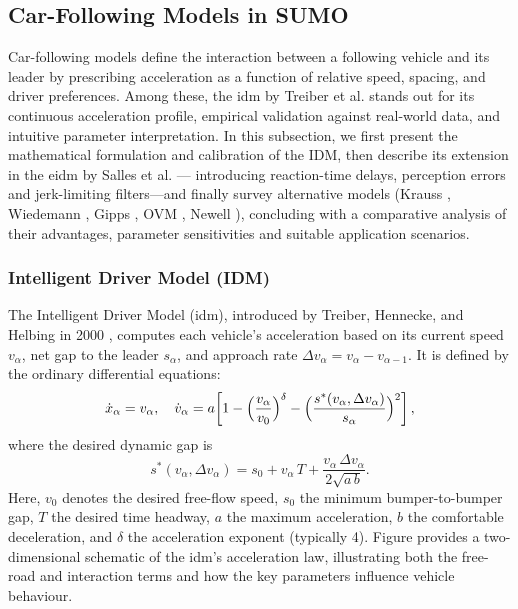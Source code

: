 
\subsection{Car-Following Models in SUMO}
\label{subsec:car_following_models}

Car-following models define the interaction between a following vehicle and its leader by prescribing acceleration as a function of relative speed, spacing, and driver preferences. Among these, the \ac{idm} by Treiber et al. \cite{Treiber_2000} stands out for its continuous acceleration profile, empirical validation against real-world data, and intuitive parameter interpretation. In this subsection, we first present the mathematical formulation and calibration of the IDM, then describe its extension in the \ac{eidm} by Salles et al. \cite{Salles2022} --- introducing reaction-time delays, perception errors and jerk-limiting filters—and finally survey alternative models (Krauss \cite{Krauss1997}, Wiedemann \cite{Wiedemann1974}, Gipps \cite{Gipps1981}, OVM \cite{Bando1995}, Newell \cite{Newell1961}), concluding with a comparative analysis of their advantages, parameter sensitivities and suitable application scenarios.

\subsubsection{Intelligent Driver Model (IDM)}
\label{subsubsec:idm}
The Intelligent Driver Model (\ac{idm}), introduced by Treiber, Hennecke, and Helbing in 2000 \cite{Treiber_2000}, computes each vehicle’s acceleration based on its current speed $v_\alpha$, net gap to the leader $s_\alpha$, and approach rate $\Delta v_\alpha = v_\alpha - v_{\alpha-1}$. It is defined by the ordinary differential equations:
\[
\dot{x}_\alpha = v_\alpha,
\quad
\dot{v}_\alpha = a\!\left[1 - \Bigl(\frac{v_\alpha}{v_0}\Bigr)^\delta - \Bigl(\frac{s^*(v_\alpha,\Delta v_\alpha)}{s_\alpha}\Bigr)^2\right],
\]
where the desired dynamic gap is
\[
s^*(v_\alpha,\Delta v_\alpha) = s_0 + v_\alpha\,T + \frac{v_\alpha\,\Delta v_\alpha}{2\sqrt{a\,b}}.
\]
Here, \(v_0\) denotes the desired free-flow speed, \(s_0\) the minimum bumper-to-bumper gap, \(T\) the desired time headway, \(a\) the maximum acceleration, \(b\) the comfortable deceleration, and \(\delta\) the acceleration exponent (typically 4). Figure%
provides a two-dimensional schematic of the \ac{idm}’s acceleration law, illustrating both the free-road and interaction terms and how the key parameters influence vehicle behaviour.

